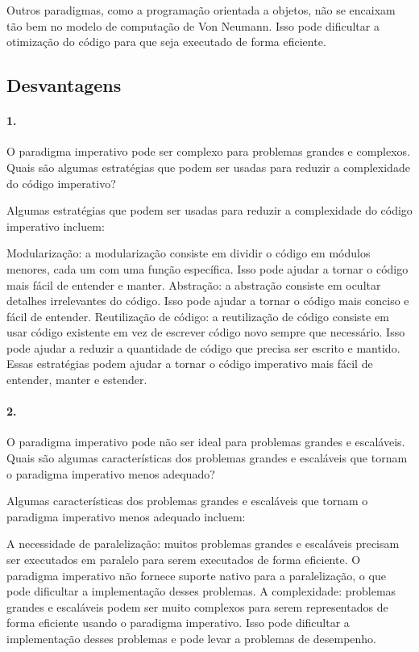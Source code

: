 Outros paradigmas, como a programação orientada a objetos, não se encaixam tão bem no modelo de computação de Von Neumann. Isso pode dificultar a otimização do código para que seja executado de forma eficiente.

\subsection{Desvantagens}

\paragraph{1.}O paradigma imperativo pode ser complexo para problemas grandes e complexos. Quais são algumas estratégias que podem ser usadas para reduzir a complexidade do código imperativo?

Algumas estratégias que podem ser usadas para reduzir a complexidade do código imperativo incluem:

Modularização: a modularização consiste em dividir o código em módulos menores, cada um com uma função específica. Isso pode ajudar a tornar o código mais fácil de entender e manter.
Abstração: a abstração consiste em ocultar detalhes irrelevantes do código. Isso pode ajudar a tornar o código mais conciso e fácil de entender.
Reutilização de código: a reutilização de código consiste em usar código existente em vez de escrever código novo sempre que necessário. Isso pode ajudar a reduzir a quantidade de código que precisa ser escrito e mantido.
Essas estratégias podem ajudar a tornar o código imperativo mais fácil de entender, manter e estender.

\paragraph{2.}O paradigma imperativo pode não ser ideal para problemas grandes e escaláveis. Quais são algumas características dos problemas grandes e escaláveis que tornam o paradigma imperativo menos adequado?

Algumas características dos problemas grandes e escaláveis que tornam o paradigma imperativo menos adequado incluem:

A necessidade de paralelização: muitos problemas grandes e escaláveis precisam ser executados em paralelo para serem executados de forma eficiente. O paradigma imperativo não fornece suporte nativo para a paralelização, o que pode dificultar a implementação desses problemas.
A complexidade: problemas grandes e escaláveis podem ser muito complexos para serem representados de forma eficiente usando o paradigma imperativo. Isso pode dificultar a implementação desses problemas e pode levar a problemas de desempenho.

